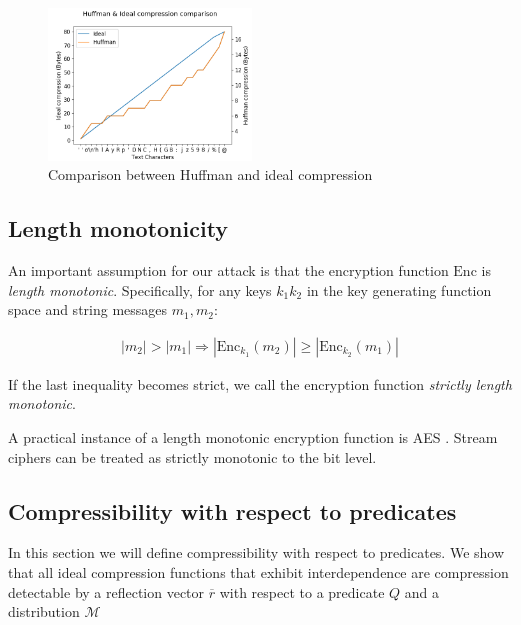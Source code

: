     \begin{figure}[thpb]
        \centering
            \includegraphics[width=0.48\textwidth]{idealness_experiments/huffman_idealness.png}
        \caption{Comparison between Huffman and ideal compression}
        \label{fig:huffman_idealness}
    \end{figure}

\subsection{Length monotonicity}\label{subsec:lenmonotone}

An important assumption for our attack is that the encryption function
$\textrm{Enc}$ is \textit{length monotonic}. Specifically, for any keys $k_1
k_2$ in the key generating function space and string messages $m_1, m_2$:

\begin{equation*}
\begin{split}
|m_2| > |m_1|
\Rightarrow
|\textrm{Enc}_{k_1}(m_2)| \geq |\textrm{Enc}_{k_2}(m_1)|
\end{split}
\end{equation*}

If the last inequality becomes strict, we call the encryption function
\textit{strictly length monotonic}.

A practical instance of a length monotonic encryption function is AES \cite{standard2001announcing}.
Stream ciphers can be treated as strictly monotonic to the bit level.

\subsection{Compressibility with respect to predicates}\label{subsec:propertycom}
In this section we will define compressibility with respect to predicates. We
show that all ideal compression functions that exhibit interdependence are
compression detectable by a reflection vector $\overbar{r}$ with respect to a
predicate $Q$ and a distribution $\mathcal{M}$

